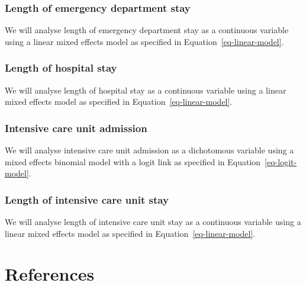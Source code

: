 \documentclass[
]{scrartcl}
\begin{document}
\hypertarget{length-of-emergency-department-stay}{%
\subsubsection{Length of emergency department
stay}\label{length-of-emergency-department-stay}}

We will analyse length of emergency department stay as a continuous
variable using a linear mixed effects model as specified in
Equation~\ref{eq-linear-model}.

\hypertarget{length-of-hospital-stay}{%
\subsubsection{Length of hospital stay}\label{length-of-hospital-stay}}

We will analyse length of hospital stay as a continuous variable using a
linear mixed effects model as specified in
Equation~\ref{eq-linear-model}.

\hypertarget{intensive-care-unit-admission}{%
\subsubsection{Intensive care unit
admission}\label{intensive-care-unit-admission}}

We will analyse intensive care unit admission as a dichotomous variable
using a mixed effects binomial model with a logit link as specified in
Equation~\ref{eq-logit-model}.

\hypertarget{length-of-intensive-care-unit-stay}{%
\subsubsection{Length of intensive care unit
stay}\label{length-of-intensive-care-unit-stay}}

We will analyse length of intensive care unit stay as a continuous
variable using a linear mixed effects model as specified in
Equation~\ref{eq-linear-model}.

\hypertarget{references}{%
\section*{References}\label{references}}
\end{document}
